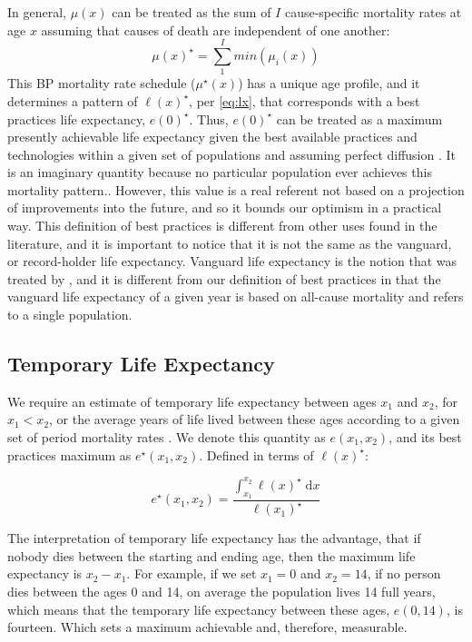 \documentclass{article}
\newcommand{\dd}{\; \mathrm{d}}
\begin{document}
\begin{spacing}{1.5}
In general, $\mu(x)$ can be treated as the sum of $I$ cause-specific mortality
rates at age $x$ assuming that causes of death are independent of one another:
\begin{equation}
\label{eq:mxmin}
\mu(x)^{\star} = \sum_1^I min(\mu_i(x))
\end{equation}
This BP mortality rate schedule ($\mu^{\star}(x)$) has a unique
age profile, and it determines a pattern of $\ell(x)^{\star}$, per \eqref{eq:lx}, that corresponds with a
best practices life expectancy, $e(0)^{\star}$. Thus, $e(0)^{\star}$ can be treated as a
maximum presently achievable life expectancy given the best available
practices and technologies within a given set of populations and assuming
perfect diffusion \citep{vallin2008minimum}. It is an imaginary quantity because no particular population
ever achieves this mortality pattern.. However, this value is
a real referent not based on a projection of improvements into the future, and
so it bounds our optimism in a practical way. This definition of best practices
is different from other uses found in the literature, and it is important to
notice that it is not the same as the vanguard, or record-holder life
expectancy. Vanguard life expectancy is the notion that was treated by
\citet{oeppen2002broken}, and it is different from our definition of best
practices in that the vanguard life expectancy of a given year is based on
all-cause mortality and refers to a single population.

\subsection*{Temporary Life Expectancy}

We require an estimate of temporary life expectancy between ages
$x_1$ and $x_2$, for $x_1<x_2$, or the average years of life lived between these ages according to a given set of period mortality rates \citep{arriaga1984}. We denote this quantity as
$e(x_1,x_2)$, and its best practices maximum as $e^{\star}(x_1,x_2)$. Defined in
terms of $\ell(x)^\star$:

\begin{equation}
e^{\star}(x_1,x_2) = \frac{\int _{x_1}^{x_2} \ell(x)^\star \dd x}{\ell(x_1)^\star}
\end{equation}

The interpretation of temporary life expectancy has the advantage, that if nobody dies between the starting and ending age, then the maximum life expectancy is $x_2-x_1$.  For example, if we set $x_1=0$ and $x_2=14$, if no person dies between the ages 0 and 14, on average the population lives 14 full years, which means that the temporary life expectancy between these ages, $e(0,14)$, is fourteen. Which sets a maximum achievable and, therefore, measurable.


\end{spacing}
\end{document}
